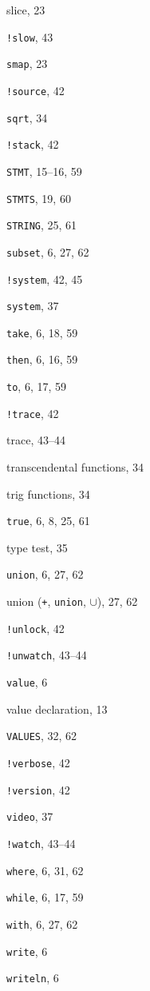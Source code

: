 \begin{theindex}
\item {slice}, 23
\item {{\tt !slow}}, 43
\item {{\tt smap}}, 23
\item {{\tt !source}}, 42
\item {{\tt sqrt}}, 34
\item {{\tt !stack}}, 42
\item {{\tt STMT}}, 15--16, 59
\item {{\tt STMTS}}, 19, 60
\item {{\tt STRING}}, 25, 61
\item {{\tt subset}}, 6, 27, 62
\item {{\tt !system}}, 42, 45
\item {{\tt system}}, 37
\indexspace
\item {{\tt take}}, 6, 18, 59
\item {{\tt then}}, 6, 16, 59
\item {{\tt to}}, 6, 17, 59
\item {{\tt !trace}}, 42
\item {trace}, 43--44
\item {transcendental functions}, 34
\item {trig functions}, 34
\item {{\tt true}}, 6, 8, 25, 61
\item {type test}, 35
\indexspace
\item {{\tt union}}, 6, 27, 62
\item {union ({\tt +}, {\tt union}, \(\cup\))}, 27, 62
\item {{\tt !unlock}}, 42
\item {{\tt !unwatch}}, 43--44
\indexspace
\item {{\tt value}}, 6
\item {value declaration}, 13
\item {{\tt VALUES}}, 32, 62
\item {{\tt !verbose}}, 42
\item {{\tt !version}}, 42
\item {{\tt video}}, 37
\indexspace
\item {{\tt !watch}}, 43--44
\item {{\tt where}}, 6, 31, 62
\item {{\tt while}}, 6, 17, 59
\item {{\tt with}}, 6, 27, 62
\item {{\tt write}}, 6
\item {{\tt writeln}}, 6
\indexspace
\indexspace
\indexspace
\indexspace
\end{theindex}
